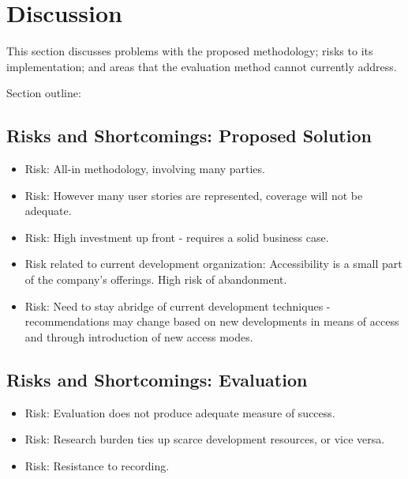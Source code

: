 \section{Discussion} %
\label{sec:discussion}

This section discusses problems with the proposed methodology; risks to its implementation; and areas that the evaluation method cannot currently address.

Section outline:


\subsection{Risks and Shortcomings: Proposed Solution} %
\label{sub:risks_and_shortcomings_proposed_solution}

\begin{itemize}
	\item Risk: All-in methodology, involving many parties.
	\item Risk: However many user stories are represented, coverage will not be adequate.
	\item Risk: High investment up front - requires a solid business case.
	\item Risk related to current development organization: Accessibility is a small part of the company's offerings. High risk of abandonment.
	\item Risk: Need to stay abridge of current development techniques - recommendations may change based on new developments in means of access and through introduction of new access modes.
\end{itemize}



\subsection{Risks and Shortcomings: Evaluation} %
\label{sub:risks_and_shortcomings_evaluation}

\begin{itemize}
	\item Risk: Evaluation does not produce adequate measure of success.
	\item Risk: Research burden ties up scarce development resources, or vice versa.
	\item Risk: Resistance to recording.
\end{itemize}
